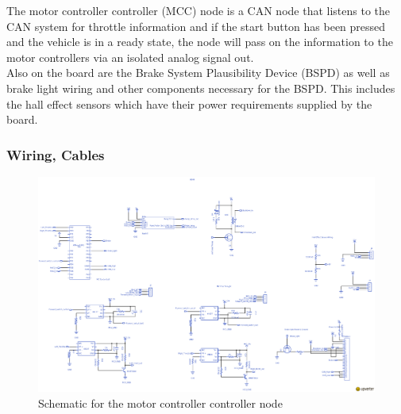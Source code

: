\documentclass{article}
\begin{document}
        The motor controller controller (MCC) node is a CAN node that listens to the CAN system for throttle information and if the start button has been pressed and the vehicle is in a ready state, the node will pass on the information to the motor controllers via an isolated analog signal out.\\

            Also on the board are the Brake System Plausibility Device (BSPD) as well as brake light wiring and other components necessary for the BSPD. This includes the hall effect sensors which have their power requirements supplied by the board.\\


        \subsubsection{Wiring, Cables}

        \begin{figure}
            \includegraphics[width=\textheight]{mccschem}
            \caption{Schematic for the motor controller controller node}
            \label{mccschem}
        \end{figure}
\end{document}
